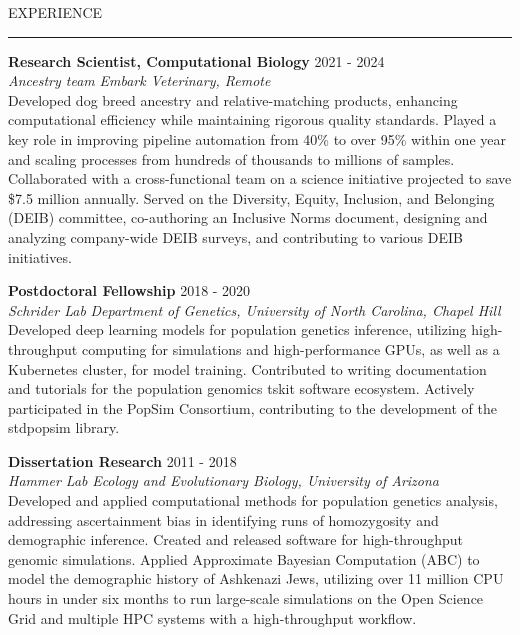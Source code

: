 \documentclass{resume} %
\renewenvironment{rSection}[1]{
\sectionskip
\textcolor{RoyalPurple}{\MakeUppercase{#1}}
\sectionlineskip
\hrule
\begin{list}{}{
\setlength{\leftmargin}{1.5em}
}
\item[]
}{
\end{list}
}
\begin{document}
\begin{rSection}{Experience}

{\bf Research Scientist, Computational Biology} \hfill 2021 - 2024\\ 
{\em Ancestry team} \hfill {\em Embark Veterinary, Remote}\\
Developed dog breed ancestry and relative-matching products, enhancing computational efficiency while maintaining rigorous quality standards. Played a key role in improving pipeline automation from 40\% to over 95\% within one year and scaling processes from hundreds of thousands to millions of samples. Collaborated with a cross-functional team on a science initiative projected to save \$7.5 million annually.  
Served on the Diversity, Equity, Inclusion, and Belonging (DEIB) committee, co-authoring an Inclusive Norms document, designing and analyzing company-wide DEIB surveys, and contributing to various DEIB initiatives.

{\bf Postdoctoral Fellowship} \hfill 2018 - 2020\\ 
{\em Schrider Lab} \hfill {\em Department of Genetics, University of North Carolina, Chapel Hill}\\
Developed deep learning models for population genetics inference, utilizing high-throughput computing for simulations and high-performance GPUs, as well as a Kubernetes cluster, for model training. Contributed to writing documentation and tutorials for the population genomics tskit software ecosystem. Actively participated in the PopSim Consortium, contributing to the development of the stdpopsim library.

{\bf Dissertation Research} \hfill 2011 - 2018\\ 
{\em Hammer Lab} \hfill {\em Ecology and Evolutionary Biology, University of Arizona}\\
Developed and applied computational methods for population genetics analysis, addressing ascertainment bias in identifying runs of homozygosity and demographic inference. Created and released software for high-throughput genomic simulations. Applied Approximate Bayesian Computation (ABC) to model the demographic history of Ashkenazi Jews, utilizing over 11 million CPU hours in under six months to run large-scale simulations on the Open Science Grid and multiple HPC systems with a high-throughput workflow.

\end{rSection}

\end{document}
